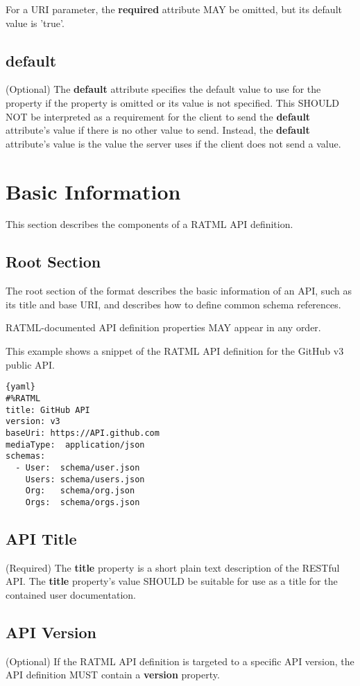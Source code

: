 For a URI parameter, the \textbf{required} attribute MAY be omitted, but its default value is 'true'.

\subsection{default}
(Optional)
The \textbf{default} attribute specifies the default value to use for the property if the property is omitted or its value is not specified. This SHOULD NOT be interpreted as a requirement for the client to send the \textbf{default} attribute's value if there is no other value to send. Instead, the \textbf{default} attribute's value is the value the server uses if the client does not send a value.


\section{Basic Information}


This section describes the components of a RATML API definition.

\subsection{Root Section}

The root section of the format describes the basic information of an API, such as its title and base URI, and describes how to define common schema references.

RATML-documented API definition properties MAY appear in any order.

This example shows a snippet of the RATML API definition for the GitHub v3 public API.

\begin{lstlisting}{yaml}
#%RATML
title: GitHub API
version: v3
baseUri: https://API.github.com
mediaType:  application/json
schemas:
  - User:  schema/user.json
    Users: schema/users.json
    Org:   schema/org.json
    Orgs:  schema/orgs.json
\end{lstlisting}

\subsection{API Title}
(Required)
The \textbf{title} property is a short plain text description of the RESTful API. The \textbf{title} property's value SHOULD be suitable for use as a title for the contained user documentation.

\subsection{API Version}
(Optional)
If the RATML API definition is targeted to a specific API version, the API definition MUST contain a \textbf{version} property.

